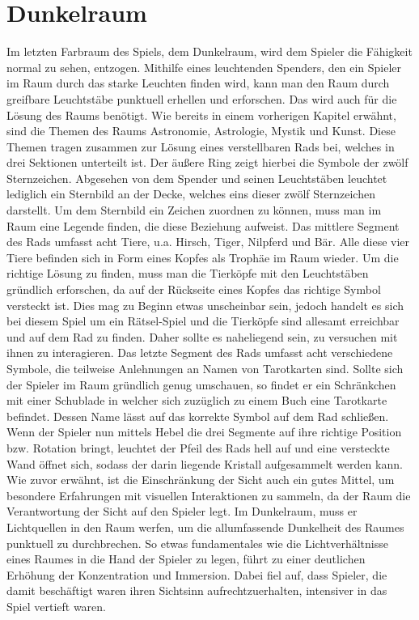 \section{Dunkelraum}
Im letzten Farbraum des Spiels, dem Dunkelraum, wird dem Spieler die Fähigkeit normal zu sehen, entzogen. Mithilfe eines leuchtenden Spenders, den ein Spieler im Raum durch das starke Leuchten finden wird, kann man den Raum durch greifbare Leuchtstäbe punktuell erhellen und erforschen. Das wird auch für die Lösung des Raums benötigt. Wie bereits in einem vorherigen Kapitel erwähnt, sind die Themen des Raums Astronomie, Astrologie, Mystik und Kunst. Diese Themen tragen zusammen zur Lösung eines verstellbaren Rads bei, welches in drei Sektionen unterteilt ist. Der äußere Ring zeigt hierbei die Symbole der zwölf Sternzeichen. Abgesehen von dem Spender und seinen Leuchtstäben leuchtet lediglich ein Sternbild an der Decke, welches eins dieser zwölf Sternzeichen darstellt. Um dem Sternbild ein Zeichen zuordnen zu können, muss man im Raum eine Legende finden, die diese Beziehung aufweist. Das mittlere Segment des Rads umfasst acht Tiere, u.a. Hirsch, Tiger, Nilpferd und Bär. Alle diese vier Tiere befinden sich in Form eines Kopfes als Trophäe im Raum wieder. Um die richtige Lösung zu finden, muss man die Tierköpfe mit den Leuchtstäben gründlich erforschen, da auf der Rückseite eines Kopfes das richtige Symbol versteckt ist. Dies mag zu Beginn etwas unscheinbar sein, jedoch handelt es sich bei diesem Spiel um ein Rätsel-Spiel und die Tierköpfe sind allesamt erreichbar und auf dem Rad zu finden. Daher sollte es naheliegend sein, zu versuchen mit ihnen zu interagieren. Das letzte Segment des Rads umfasst acht verschiedene Symbole, die teilweise Anlehnungen an Namen von Tarotkarten sind. Sollte sich der Spieler im Raum gründlich genug umschauen, so findet er ein Schränkchen mit einer Schublade in welcher sich zuzüglich zu einem Buch eine Tarotkarte befindet. Dessen Name lässt auf das korrekte Symbol auf dem Rad schließen. Wenn der Spieler nun mittels Hebel die drei Segmente auf ihre richtige Position bzw. Rotation bringt, leuchtet der Pfeil des Rads hell auf und eine versteckte Wand öffnet sich, sodass der darin liegende Kristall aufgesammelt werden kann.\\
Wie zuvor erwähnt, ist die Einschränkung der Sicht auch ein gutes Mittel, um besondere Erfahrungen mit visuellen Interaktionen zu sammeln, da der Raum die Verantwortung der Sicht auf den Spieler legt. Im Dunkelraum, muss er Lichtquellen in den Raum werfen, um die allumfassende Dunkelheit des Raumes punktuell zu durchbrechen. So etwas fundamentales wie die Lichtverhältnisse eines Raumes in die Hand der Spieler zu legen, führt zu einer deutlichen Erhöhung der Konzentration und Immersion. Dabei fiel auf, dass Spieler, die damit beschäftigt waren ihren Sichtsinn aufrechtzuerhalten, intensiver in das Spiel vertieft waren.

